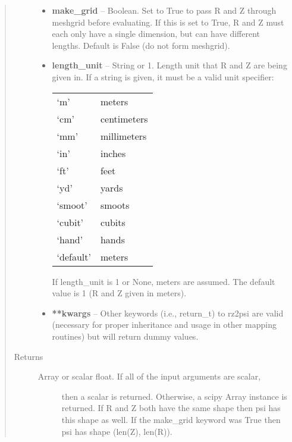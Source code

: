 \documentclass[letterpaper,10pt,english]{sphinxmanual}
\begin{document}
\begin{fulllineitems}
\begin{fulllineitems}
\begin{quote}
\begin{description}
\begin{itemize}
\item {} 
\textbf{make\_grid} -- Boolean.
Set to True to pass R and Z through meshgrid
before evaluating. If this is set to True, R and Z must each
only have a single dimension, but can have different lengths.
Default is False (do not form meshgrid).

\item {} 
\textbf{length\_unit} -- 
String or 1.
Length unit that R and Z are being given
in. If a string is given, it must be a valid unit specifier:

\begin{tabulary}{\linewidth}{|L|L|}
\hline

`m'
 & 
meters
\\

`cm'
 & 
centimeters
\\

`mm'
 & 
millimeters
\\

`in'
 & 
inches
\\

`ft'
 & 
feet
\\

`yd'
 & 
yards
\\

`smoot'
 & 
smoots
\\

`cubit'
 & 
cubits
\\

`hand'
 & 
hands
\\

`default'
 & 
meters
\\
\hline\end{tabulary}


If length\_unit is 1 or None, meters are assumed. The default
value is 1 (R and Z given in meters).


\item {} 
\textbf{**kwargs} -- Other keywords (i.e., return\_t) to rz2psi are valid
(necessary for proper inheritance and usage in other mapping routines)
but will return dummy values.

\end{itemize}

\item[{Returns}] \leavevmode
\begin{description}
\item[{Array or scalar float. If all of the input arguments are scalar,}] \leavevmode
then a scalar is returned. Otherwise, a scipy Array instance is
returned. If R and Z both have the same shape then psi has this
shape as well. If the make\_grid keyword was True then psi has
shape (len(Z), len(R)).


\end{description}
\end{description}
\end{quote}
\end{fulllineitems}
\end{fulllineitems}
\end{document}
